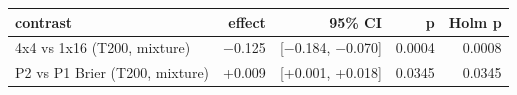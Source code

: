 \begin{tabular}{lrrrr}\toprule contrast & effect & 95\% CI & p & Holm p\\\midrule
4x4 vs 1x16 (T200, mixture) & $-$0.125 & [$-$0.184, $-$0.070] & 0.0004 & 0.0008\\
P2 vs P1 Brier (T200, mixture) & +0.009 & [+0.001, +0.018] & 0.0345 & 0.0345\\
\bottomrule\end{tabular}
